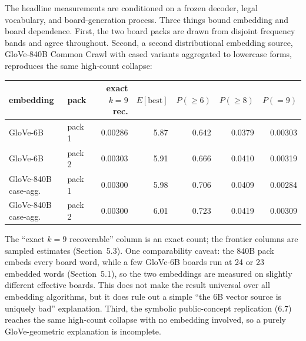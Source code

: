 \documentclass[11pt]{article}
\begin{document}
The headline measurements are conditioned on a frozen decoder, legal vocabulary,
and board-generation process. Three things bound embedding and board dependence.
First, the two board packs are drawn from disjoint frequency bands and agree
throughout. Second, a second distributional embedding source, GloVe-840B Common
Crawl with cased variants aggregated to lowercase forms, reproduces the same
high-count collapse:

\begin{center}
\begin{tabular}{llrrrrr}
\toprule
embedding & pack & exact $k{=}9$ rec. & $E[\text{best}]$ & $P(\ge 6)$ & $P(\ge 8)$ & $P(=9)$ \\
\midrule
GloVe-6B & pack 1 & 0.00286 & 5.87 & 0.642 & 0.0379 & 0.00303 \\
GloVe-6B & pack 2 & 0.00303 & 5.91 & 0.666 & 0.0410 & 0.00319 \\
GloVe-840B case-agg. & pack 1 & 0.00300 & 5.98 & 0.706 & 0.0409 & 0.00284 \\
GloVe-840B case-agg. & pack 2 & 0.00300 & 6.01 & 0.723 & 0.0419 & 0.00309 \\
\bottomrule
\end{tabular}
\end{center}

The ``exact $k{=}9$ recoverable'' column is an exact count; the frontier columns
are sampled estimates (Section~5.3). One comparability caveat: the 840B pack
embeds every board word, while a few GloVe-6B boards run at 24 or 23 embedded
words (Section~5.1), so the two embeddings are measured on slightly different
effective boards. This does not make the result universal over all embedding
algorithms, but it does rule out a simple ``the 6B vector source is uniquely bad''
explanation. Third, the symbolic public-concept replication (6.7) reaches the same
high-count collapse with no embedding involved, so a purely GloVe-geometric
explanation is incomplete.
\end{document}
